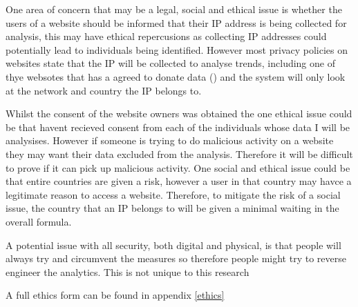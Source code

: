 
One area of concern that may be a legal, social and ethical issue is whether the users of a website should be informed that their IP address is being collected for analysis, this may have ethical repercusions as collecting IP addresses could potentially lead to individuals being identified. However most privacy policies on websites state that the IP will be collected to analyse trends, including one of thye websotes that has a agreed to donate data (\cite{PetersWebPrivacy}) and the system will only look at the network and country the IP belongs to.


Whilst the  consent of the website owners was  obtained the one ethical issue could be that  havent recieved consent from each of the individuals whose data I will be analysises. However if someone is trying to do malicious activity on a website they may want their data excluded from the analysis. Therefore it will be difficult to prove if it can pick up malicious activity. One social and ethical issue could be that entire countries are given a risk, however a user in that country may havce a legitimate reason to access a website. Therefore, to mitigate the risk of a social issue, the country that an IP belongs to will be given a minimal waiting in the overall formula. 

A potential issue with all security, both digital and physical, is that people will always try and circumvent the measures so therefore people might try to reverse engineer the analytics. This is not unique to this research 


A full ethics  form can be found in appendix \ref{ethics}

